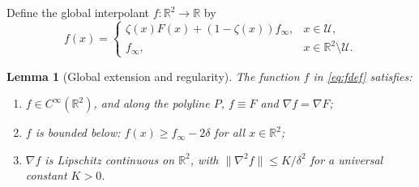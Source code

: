 \documentclass[11pt]{article}
\newtheorem{lemma}[theorem]{Lemma}
\newcommand{\R}{\mathbb{R}}
\begin{document}
Define the global interpolant $f: \R^2 \to \R$ by
\begin{equation}
\label{eq:fdef}
f(x) = \begin{cases}
\zeta(x) F(x) + (1-\zeta(x))f_\infty, & x \in \mathcal U, \\
f_\infty, & x \in \R^2\setminus \mathcal U.
\end{cases}
\end{equation}

\begin{lemma}[Global extension and regularity]
\label{lem:global}
The function $f$ in \eqref{eq:fdef} satisfies:
\begin{enumerate}
\item[(i)] $f\in C^\infty(\R^2)$, and along the polyline $P$, $f\equiv F$ and $\nabla f=\nabla F$;
\item[(ii)] $f$ is bounded below: $f(x)\ge f_\infty-2\delta$ for all $x\in\R^2$;
\item[(iii)] $\nabla f$ is Lipschitz continuous on $\R^2$, with $\|\nabla^2f\|\le K/\delta^2$ for a universal constant $K > 0$.
\end{enumerate}
\end{lemma}
\end{document}
